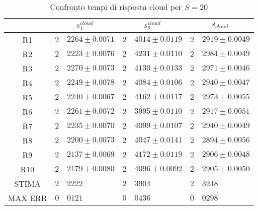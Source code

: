 \begin{table}[!h]
\begin{tabular}{c|r@{.}l|r@{.}l|r@{.}l}
& \multicolumn{2}{|c|}{$s_1^{cloud}$}
& \multicolumn{2}{|c|}{$s_2^{cloud}$}
& \multicolumn{2}{|c}{$s_{cloud}$} 
\\          
\hline
R1      & $2$&$2264 \pm 0.0071$ & $2$&$4014 \pm 0.0119$ & $2$&$2919 \pm 0.0049$ \\
R2      & $2$&$2223 \pm 0.0076$ & $2$&$4231 \pm 0.0110$ & $2$&$2984 \pm 0.0049$ \\
R3      & $2$&$2270 \pm 0.0073$ & $2$&$4130 \pm 0.0133$ & $2$&$2971 \pm 0.0046$ \\
R4      & $2$&$2249 \pm 0.0078$ & $2$&$4084 \pm 0.0106$ & $2$&$2940 \pm 0.0047$ \\
R5      & $2$&$2240 \pm 0.0067$ & $2$&$4162 \pm 0.0117$ & $2$&$2973 \pm 0.0055$ \\
R6      & $2$&$2261 \pm 0.0072$ & $2$&$3995 \pm 0.0110$ & $2$&$2917 \pm 0.0051$ \\
R7      & $2$&$2235 \pm 0.0070$ & $2$&$4099 \pm 0.0107$ & $2$&$2940 \pm 0.0049$ \\
R8      & $2$&$2200 \pm 0.0073$ & $2$&$4047 \pm 0.0141$ & $2$&$2894 \pm 0.0056$ \\
R9      & $2$&$2137 \pm 0.0069$ & $2$&$4172 \pm 0.0119$ & $2$&$2906 \pm 0.0048$ \\
R10     & $2$&$2179 \pm 0.0080$ & $2$&$4096 \pm 0.0092$ & $2$&$2905 \pm 0.0050$ \\
STIMA   & $2$&$2222$            & $2$&$3904$            & $2$&$3248$            \\
MAX ERR & $0$&$0121$            & $0$&$0436$            & $0$&$0298$            
\end{tabular}
\centering
\caption{Confronto tempi di risposta cloud per $S=20$}
\label{cloud_srv_20}
\end{table}

